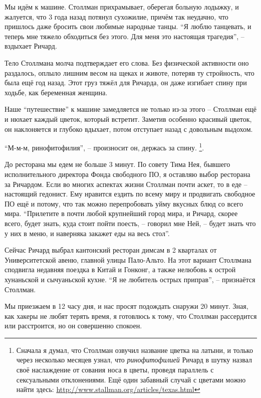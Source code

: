 Мы идём к машине. Столлман прихрамывает, оберегая больную лодыжку, и жалуется, что 3 года назад потянул сухожилие, причём так неудачно, что пришлось даже бросить свои любимые народные танцы. \enquote{Я люблю танцевать, и теперь мне тяжело обходиться без этого. Для меня это настоящая трагедия}, -- вздыхает Ричард.

Тело Столлмана молча подтверждает его слова. Без физической активности оно раздалось, оплыло лишним весом на щеках и животе, потеряв ту стройность, что была ещё год назад. Этот груз тяжёл для Ричарда, он даже изгибает спину при ходьбе, как беременная женщина.

Наше \enquote{путешествие} к машине замедляется не только из-за этого -- Столлман ещё и нюхает каждый цветок, который встретит. Заметив особенно красивый цветок, он наклоняется и глубоко вдыхает, потом отступает назад с довольным выдохом.

\enquote{М-м-м, ринофитофилия}, -- произносит он, держась за спину. \footnote{Сначала я думал, что Столлман озвучил название цветка на латыни, и только через несколько месяцев узнал, что \textit{ринофитофилией} Ричард в шутку назвал своё наслаждение от сования носа в цветы, проведя параллель с сексуальными отклонениями. Ещё один забавный случай с цветами можно найти здесь: \url{http://www.stallman.org/articles/texas.html}}.

До ресторана мы едем не больше 3 минут. По совету Тима Нея, бывшего исполнительного директора Фонда свободного ПО, я оставляю выбор ресторана за Ричардом. Если во многих аспектах жизни Столлман почти аскет, то в еде -- настоящий гедонист. Ему нравится ездить по всему миру и продвигать свободное ПО ещё и потому, что так можно перепробовать уйму вкусных блюд со всего мира. \enquote{Прилетите в почти любой крупнейший город мира, и Ричард, скорее всего, будет знать, куда стоит пойти поесть, -- говорил мне Ней, -- будет знать что у них в меню, и наверняка закажет еды на весь стол}.

Сейчас Ричард выбрал кантонский ресторан димсам в 2 кварталах от Университетской авеню, главной улицы Пало-Альто. На этот вариант Столлмана сподвигла недавняя поездка в Китай и Гонконг, а также нелюбовь к острой хунаньской и сычуаньской кухне. \enquote{Я не любитель острых приправ}, -- признаётся Столлман.

Мы приезжаем в 12 часу дня, и нас просят подождать снаружи 20 минут. Зная, как хакеры не любят терять время, я готовлюсь к тому, что Столлман рассердится или расстроится, но он совершенно спокоен.

